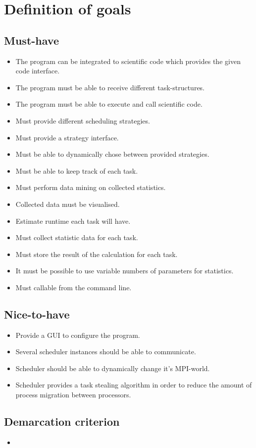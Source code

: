 \section{Definition of goals}
	\subsection{Must-have}
		\begin{itemize}
			\item The program can be integrated to scientific code which provides the given code interface.
			\item The program must be able to receive different task-structures.
			\item The program must be able to execute and call scientific code.
			\item Must provide different scheduling strategies.
			\item Must provide a strategy interface.
			\item Must be able to dynamically chose between provided strategies.
			\item Must be able to keep track of each task.
			\item Must perform data mining on collected statistics.
			\item Collected data must be visualised.
			\item Estimate runtime each task will have.
			\item Must collect statistic data for each task.
			\item Must store the result of the calculation for each task.
			\item It must be possible to use variable numbers of parameters for statistics.
			\item Must callable from the command line.
		\end{itemize}
	\subsection{Nice-to-have}
		\begin{itemize}
			\item Provide a GUI to configure the program.
			\item Several scheduler instances should be able to communicate.
			\item Scheduler should be able to dynamically change it's MPI-world.
			\item Scheduler provides a task stealing algorithm in order to reduce the amount of process migration between processors.
		\end{itemize}
	\subsection{Demarcation criterion}
		\begin{itemize}
			\item
		\end{itemize}